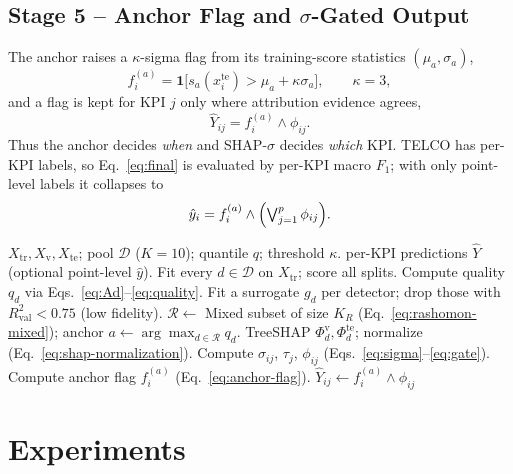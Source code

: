 \documentclass[conference]{IEEEtran}
\begin{document}
\subsection{Stage 5 -- Anchor Flag and $\sigma$-Gated Output}
\label{sec:fusion}
The anchor raises a $\kappa$-sigma flag from its training-score
statistics $(\mu_a,\sigma_a)$,
\begin{equation}
f_i^{(a)}=\mathbf{1}\bigl[s_a(x_i^{\mathrm{te}})>\mu_a+\kappa\sigma_a\bigr],\qquad \kappa=3,
\label{eq:anchor-flag}
\end{equation}
and a flag is kept for KPI $j$ only where attribution evidence agrees,
\begin{equation}
\hat{Y}_{ij}=f_i^{(a)}\wedge\phi_{ij}.
\label{eq:final}
\end{equation}
Thus the anchor decides \emph{when} and SHAP-$\sigma$ decides \emph{which}
KPI. TELCO has per-KPI labels, so Eq.~\eqref{eq:final} is evaluated by
per-KPI macro $F_1$; with only point-level labels it collapses to
\begin{equation}
\hat{y}_i=f_i^{(a)}\wedge\Bigl(\textstyle\bigvee_{j=1}^{p}\phi_{ij}\Bigr).
\label{eq:point-collapse}
\end{equation}


\begin{algorithm}[t]
\caption{SHAP-$\sigma$ (label-free)}
\label{alg:shap-sigma}
\begin{algorithmic}[1]
\REQUIRE $X_{\mathrm{tr}},X_{\mathrm{v}},X_{\mathrm{te}}$; pool $\mathcal{D}$ ($K{=}10$); quantile $q$; threshold $\kappa$.
\ENSURE per-KPI predictions $\hat{Y}$ (optional point-level $\hat{y}$).
\STATE Fit every $d\in\mathcal{D}$ on $X_{\mathrm{tr}}$; score all splits.
\STATE Compute quality $q_d$ via Eqs.~\eqref{eq:Ad}--\eqref{eq:quality}.
\STATE Fit a surrogate $g_d$ per detector; drop those with $R^2_{\mathrm{val}}<0.75$ (low fidelity).
\STATE $\mathcal{R}\gets$ Mixed subset of size $K_R$ (Eq.~\eqref{eq:rashomon-mixed}); anchor $a\gets\arg\max_{d\in\mathcal{R}}q_d$.
  \STATE TreeSHAP $\Phi_d^{\mathrm{v}},\Phi_d^{\mathrm{te}}$; normalize (Eq.~\eqref{eq:shap-normalization}).
\ENDFOR
\STATE Compute $\sigma_{ij}$, $\tau_j$, $\phi_{ij}$ (Eqs.~\eqref{eq:sigma}--\eqref{eq:gate}).
\STATE Compute anchor flag $f^{(a)}_i$ (Eq.~\eqref{eq:anchor-flag}).
\STATE $\hat{Y}_{ij}\gets f^{(a)}_i\wedge\phi_{ij}$
\end{algorithmic}
\end{algorithm}


\section{Experiments}
\label{sec:exp}
\end{document}
